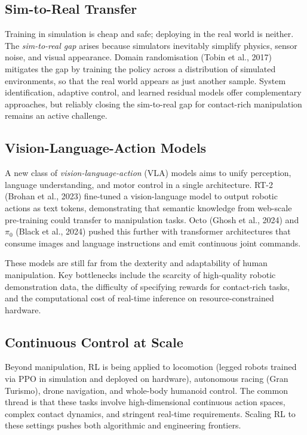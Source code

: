 \subsection{Sim-to-Real Transfer}

Training in simulation is cheap and safe; deploying in the real world
is neither.  The \emph{sim-to-real gap}
arises because simulators inevitably simplify physics, sensor noise,
and visual appearance.  Domain randomisation (Tobin et al., 2017)
mitigates the gap by training the policy across a distribution of
simulated environments, so that the real world appears as just another
sample.  System identification, adaptive control, and learned residual
models offer complementary approaches, but reliably closing the
sim-to-real gap for contact-rich manipulation remains an active
challenge.

\subsection{Vision-Language-Action Models}

A new class of \emph{vision-language-action} (VLA) models aims to
unify perception, language understanding, and motor control in a
single architecture.  RT-2 (Brohan et al., 2023) fine-tuned a
vision-language model to output robotic actions as text tokens,
demonstrating that semantic knowledge from web-scale pre-training
could transfer to manipulation tasks.  Octo (Ghosh et al., 2024) and
$\pi_0$ (Black et al., 2024) pushed this further with
transformer architectures that consume images and language instructions
and emit continuous joint commands.

These models are still far from the dexterity and adaptability of
human manipulation.  Key bottlenecks include the scarcity of
high-quality robotic demonstration data, the difficulty of specifying
rewards for contact-rich tasks, and the computational cost of
real-time inference on resource-constrained hardware.

\subsection{Continuous Control at Scale}

Beyond manipulation, RL is being applied to locomotion (legged
robots trained via PPO in simulation and deployed on hardware),
autonomous racing (Gran Turismo), drone navigation, and whole-body
humanoid control.  The common thread is that these tasks involve
high-dimensional continuous action spaces, complex contact dynamics,
and stringent real-time requirements.  Scaling RL to these settings
pushes both algorithmic and engineering frontiers.


